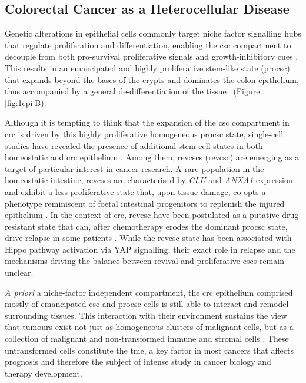\subsection{Colorectal Cancer as a Heterocellular Disease}

Genetic alterations in epithelial cells commonly target niche factor signalling hubs that regulate proliferation and differentiation, enabling the \acrshort{csc} compartment to decouple from both pro-survival proliferative signals and growth-inhibitory cues \cite{sphyris_subversion_2021}. This results in an emancipated and highly proliferative stem-like state (\acrshort{procsc}) that expands beyond the bases of the crypts and dominates the colon epithelium, thus accompanied by a general de-differentiation of the tissue~\cite{van_de_wetering_-catenintcf-4_2002} (Figure \ref{fig:1epi}B).

Although it is tempting to think that the expansion of the \acrshort{csc} compartment in \acrshort{crc} is driven by this highly proliferative homogeneous \acrshort{procsc} state, single-cell studies have revealed the presence of additional stem cell states in both homeostatic and \acrshort{crc} epithelium \cite{norkin_single-cell_2020, bankaitis_reserve_2018,barriga_mex3a_2017,bues_deterministic_2022}.
Among them, \acrlong{revcsc}s (\acrshort{revcsc}) are emerging as a target of particular interest in cancer research. A rare population in the homeostatic intestine, \acrshort{revcsc}s are characterised by \emph{CLU} and \emph{ANXA1} expression and exhibit a less proliferative state that, upon tissue damage, co-opts a phenotype reminiscent of foetal intestinal progenitors to replenish the injured epithelium \cite{ayyaz_single-cell_2019}. 
In the context of \acrshort{crc}, \acrshort{revcsc} have been postulated as a putative drug-resistant state that can, after chemotherapy erodes the dominant \acrshort{procsc} state, drive relapse in some patients \cite{rehman_colorectal_2021,alvarez-varela_mex3a_2022}. While the \acrshort{revcsc} state has been associated with Hippo pathway activation via YAP signalling, their exact role in relapse and the mechanisms driving the balance between revival and proliferative \acrshort{csc}s remain unclear.

\emph{A priori} a niche-factor independent compartment, the \acrshort{crc} epithelium comprised mostly of emancipated \acrshort{csc} and \acrshort{procsc} cells is still able to interact and remodel surrounding tissues. This interaction with their environment sustains the view that tumours exist not just as homogeneous clusters of malignant cells, but as a collection of malignant and non-transformed immune and stromal cells \cite{balkwill_tumor_2012}. These untransformed cells constitute the \acrfull{tme}, a key factor in most cancers that affects prognosis \cite{calon_stromal_2015} and therefore the subject of intense study in cancer biology and therapy development. 


